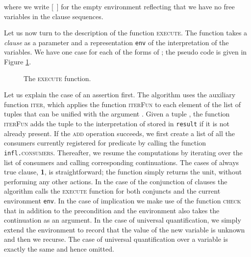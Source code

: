 where we write [\ ] for the empty environment reflecting that we have
no free variables in the clause sequences.

Let us now turn to the description of the function
\textsc{execute}. The function takes a \emph{clause}  as a
parameter and a representation {\tt env} of the interpretation of the
variables. We have one case for each of the forms of ; the pseudo
code is given in Figure \ref{figure:function-execute}.
\begin{figure}
\centering
\begin{minipage}{.77\textwidth}
\begin{algorithmic}
\State \Call{execute}{\texttt{env} =
\State \indent \textbf{let} \Call{iterFun}{}  =
\State \indent \indent \textbf{match} \texttt{result.}\Call{has}{} \textbf{with}
\State \indent \indent \indent    ()
\State \indent \indent \indent   
\State \indent \indent \indent \indent \texttt{result.}\Call{add}{}
\State \indent \indent \indent \indent \Call{iter}{} (\textbf{fun}    ) (\texttt{infl.}\Call{consumers}{} 
\State \indent \textbf{in} \Call{iter}{} \Call{iterFun}{} (\Call{unifiable}{\texttt{env},})
\end{algorithmic}
\begin{algorithmic}
\State
\end{algorithmic}
\begin{algorithmic}
  \State
\end{algorithmic}
\begin{algorithmic}
  \State
\end{algorithmic}
\begin{algorithmic}
  \State
\end{algorithmic}
\end{minipage}
\caption[]{The \textsc{execute} function.}
\label{figure:function-execute}
\end{figure}
Let us explain the case of an assertion first. The algorithm uses the
auxiliary function \textsc{iter}, which applies the function
\textsc{iterFun} to each element of the list of tuples that can be
unified with the argument . Given a tuple ,
the function \textsc{iterFun} adds the tuple to the interpretation of
 stored in \texttt{result} if it is not already present. If the
\textsc{add} operation succeeds, we first create a list of all the
consumers currently registered for predicate  by calling the
function \texttt{infl.}\textsc{consumers}. Thereafter, we resume the
computations by iterating over the list of consumers and calling
corresponding continuations.
The cases of always true clause, {\bf 1}, is straightforward; the
function simply returns the unit, without performing any other
actions.
In the case of the conjunction of clauses the algorithm calls the
\textsc{execute} function for both conjuncts and the current
environment \texttt{env}.
In the case of implication we make use of the function \textsc{check}
that in addition to the precondition and the environment also takes
the continuation  as an argument.
In the case of universal quantification, we simply extend the
environment to record that the value of the new variable is unknown
and then we recurse. The case of universal quantification over a
variable  is exactly the same and hence omitted.


